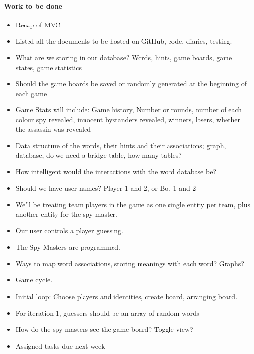 \documentclass[10pt, a4paper]{article}
\begin{document}
			\paragraph{Work to be done }
			\begin{itemize}
				\item Recap of MVC 
				\item Listed all the documents to be hosted on GitHub, code, diaries, testing.
				\item What are we storing in our database? Words, hints, game boards, game states, game statistics 
				\item Should the game boards be saved or randomly generated at the beginning of each game
				\item Game Stats will include: Game history, Number or rounds, number of each colour spy revealed, innocent bystanders revealed, winners, losers, whether the assassin was revealed 
				\item Data structure of the words, their hints and their associations; graph, database, do we need a bridge table, how many tables?
				\item How intelligent would the interactions with the word database be?
				\item Should we have user names? Player 1 and 2, or Bot 1 and 2
				\item We’ll be treating team players in the game as one single entity per team, plus another entity for the spy master.
				\item Our user controls a player guessing.
				\item The Spy Masters are programmed. 
				\item Ways to map word associations, storing meanings with each word? Graphs?
				\item Game cycle. 
				\item Initial loop: Choose players and identities, create board, arranging board.
				\item For iteration 1, guessers should be an array of random words 
				\item How do the spy masters see the game board? Toggle view?
				\item Assigned tasks due next week 
				
			\end{itemize}
			
\end{document}
